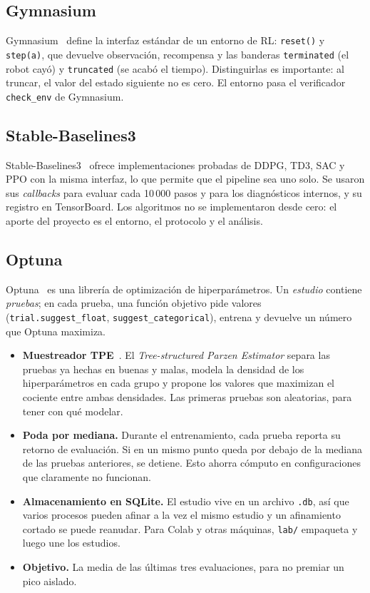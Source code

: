 \documentclass[11pt,a4paper]{article}
\newcommand{\code}[1]{\texttt{#1}}
\begin{document}
\subsection{Gymnasium}

Gymnasium~\cite{towers2024} define la interfaz estándar de un entorno de RL: \code{reset()} y \code{step(a)}, que devuelve observación, recompensa y las banderas \code{terminated} (el robot cayó) y \code{truncated} (se acabó el tiempo). Distinguirlas es importante: al truncar, el valor del estado siguiente no es cero. El entorno pasa el verificador \code{check\_env} de Gymnasium.

\subsection{Stable-Baselines3}

Stable-Baselines3~\cite{raffin2021} ofrece implementaciones probadas de DDPG, TD3, SAC y PPO con la misma interfaz, lo que permite que el pipeline sea uno solo. Se usaron sus \emph{callbacks} para evaluar cada 10\,000 pasos y para los diagnósticos internos, y su registro en TensorBoard. Los algoritmos no se implementaron desde cero: el aporte del proyecto es el entorno, el protocolo y el análisis.

\subsection{Optuna}

Optuna~\cite{akiba2019} es una librería de optimización de hiperparámetros. Un \emph{estudio} contiene \emph{pruebas}; en cada prueba, una función objetivo pide valores (\code{trial.suggest\_float}, \code{suggest\_categorical}), entrena y devuelve un número que Optuna maximiza.

\begin{itemize}
  \item \textbf{Muestreador TPE}~\cite{bergstra2011}. El \emph{Tree-structured Parzen Estimator} separa las pruebas ya hechas en buenas y malas, modela la densidad de los hiperparámetros en cada grupo y propone los valores que maximizan el cociente entre ambas densidades. Las primeras pruebas son aleatorias, para tener con qué modelar.
  \item \textbf{Poda por mediana.} Durante el entrenamiento, cada prueba reporta su retorno de evaluación. Si en un mismo punto queda por debajo de la mediana de las pruebas anteriores, se detiene. Esto ahorra cómputo en configuraciones que claramente no funcionan.
  \item \textbf{Almacenamiento en SQLite.} El estudio vive en un archivo \code{.db}, así que varios procesos pueden afinar a la vez el mismo estudio y un afinamiento cortado se puede reanudar. Para Colab y otras máquinas, \code{lab/} empaqueta y luego une los estudios.
  \item \textbf{Objetivo.} La media de las últimas tres evaluaciones, para no premiar un pico aislado.
\end{itemize}
\end{document}
